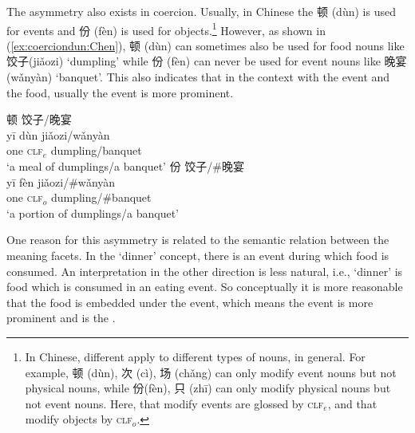 \documentclass[output=paper,colorlinks,citecolor=brown,chinesefont]{langscibook}
\begin{document}
The asymmetry also exists in coercion. Usually, in Chinese the  {\cn 顿} (d\`{u}n) is used for events and {\cn 份} (f\`{e}n) is used for objects.\footnote{In Chinese, different  apply to different types of nouns, in general. For example, {\cn 顿} (d\`{u}n), {\cn 次} (c\`{i}), {\cn 场} (ch\v{a}ng) can only modify event nouns but not physical  nouns, while {\cn 份}(f\`{e}n), {\cn 只} (zh\={i}) can only modify physical  nouns but not event nouns. Here,  that modify events are glossed by \textsc{clf}$_e$, and  that modify objects by \textsc{clf}$_o$.} However, as shown in (\ref{ex:coerciondun:Chen}), {\cn 顿} (d\`{u}n) can sometimes also be used for food nouns like {\cn 饺子}(ji\v{a}ozi) `dumpling' while {\cn 份} (f\`{e}n) can never be used for event nouns like {\cn 晚宴} (w\v{a}ny\`{a}n) `banquet'. This also indicates that in the context with the event and the food, usually the event is more prominent.

\ea \label{ex:coerciondun:Chen}
\ea \label{ex:yidundump:Chen}
 {\cn 顿} {\cn 饺子}/{\cn 晚宴}\\
y\={i} d\`{u}n ji\v{a}ozi/w\v{a}ny\`{a}n\\
one \textsc{clf}$_e$ dumpling/banquet\\
\glt `a meal of dumplings/a banquet'
\ex \label{ex:yifenbanq:Chen}
 {\cn 份} {\cn 饺子}/\#{\cn 晚宴}\\
y\={i} f\`{e}n ji\v{a}ozi/\#w\v{a}ny\`{a}n\\
one \textsc{clf}$_o$ dumpling/\#banquet\\
\glt `a portion of dumplings/a banquet'
\z\z

One reason for this asymmetry is related to the semantic relation between the meaning facets. In the `dinner' concept, there is an event during which food is %
 consumed. An interpretation in the other direction is less natural, i.e., %
  `dinner' is food which is consumed in an eating event. %
  So conceptually it is more reasonable that the food is embedded under the event, which means the event is more prominent and is the .%
\end{document}
